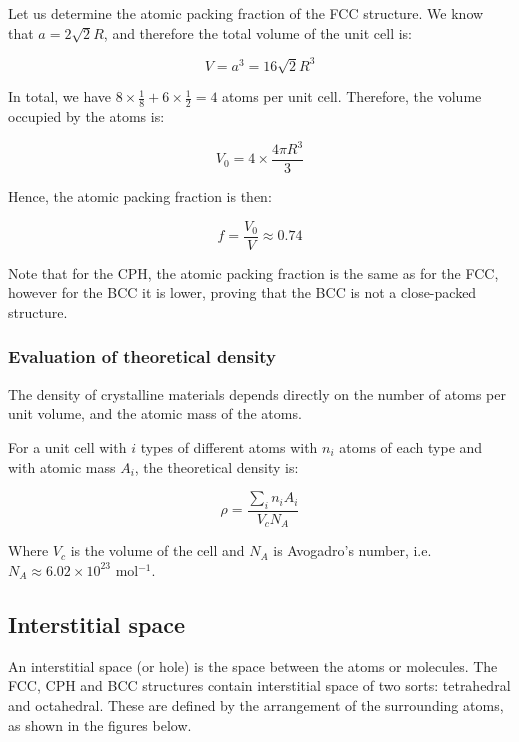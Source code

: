 \documentclass{article}
\begin{document}
\begin{example}
    Let us determine the atomic packing fraction of the FCC structure. We know that $a = 2\sqrt{2}R$, and therefore the total volume of the unit cell is:

    \[ V = a^3 = 16\sqrt{2}R^3 \]

    In total, we have $8 \times \frac{1}{8} + 6 \times \frac{1}{2} = 4$ atoms per unit cell. Therefore, the volume occupied by the atoms is:

    \[ V_0 = 4 \times \frac{4\pi R^3}{3} \]

    Hence, the atomic packing fraction is then:

    \[ f = \frac{V_0}{V} \approx 0.74 \]
\end{example}

Note that for the CPH, the atomic packing fraction is the same as for the FCC, however for the BCC it is lower, proving that the BCC is not a close-packed structure.

\subsubsection{Evaluation of theoretical density}

The density of crystalline materials depends directly on the number of atoms per unit volume, and the atomic mass of the atoms.

\begin{proposition}
    For a unit cell with $i$ types of different atoms with $n_i$ atoms of each type and with atomic mass $A_i$, the theoretical density is:

    \[ \rho = \frac{\sum_i n_iA_i}{V_cN_A} \]

    Where $V_c$ is the volume of the cell and $N_A$ is Avogadro's number, i.e. $N_A \approx 6.02 \times 10^{23}$ mol$^{-1}$.
\end{proposition}

\newpage

\subsection{Interstitial space}

\begin{definition}
    An interstitial space (or hole) is the space between the atoms or molecules. The FCC, CPH and BCC structures contain interstitial space of two sorts: tetrahedral and octahedral. These are defined by the arrangement of the surrounding atoms, as shown in the figures below.
\end{definition}
\end{document}
